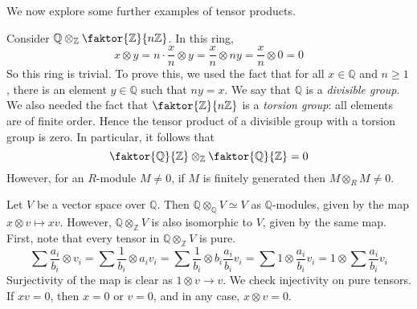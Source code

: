 We now explore some further examples of tensor products.
\begin{example}
    Consider \( \mathbb Q \otimes_{\mathbb Z} \faktor{\mathbb Z}{n\mathbb Z} \).
    In this ring,
    \[ x \otimes y = n \cdot \frac{x}{n} \otimes y = \frac{x}{n} \otimes ny = \frac{x}{n} \otimes 0 = 0 \]
    So this ring is trivial.
    To prove this, we used the fact that for all \( x \in \mathbb Q \) and \( n \geq 1 \), there is an element \( y \in \mathbb Q \) such that \( ny = x \).
    We say that \( \mathbb Q \) is a \emph{divisible group}.
    We also needed the fact that \( \faktor{\mathbb Z}{n\mathbb Z} \) is a \emph{torsion group}: all elements are of finite order.
    Hence the tensor product of a divisible group with a torsion group is zero.
    In particular, it follows that
    \[ \faktor{\mathbb Q}{\mathbb Z} \otimes_{\mathbb Z} \faktor{\mathbb Q}{\mathbb Z} = 0 \]
    However, for an \( R \)-module \( M \neq 0 \), if \( M \) is finitely generated then \( M \otimes_R M \neq 0 \).
\end{example}
\begin{example}
    Let \( V \) be a vector space over \( \mathbb Q \).
    Then \( \mathbb Q \otimes_{\mathbb Q} V \simeq V \) as \( \mathbb Q \)-modules, given by the map \( x \otimes v \mapsto xv \).
    However, \( \mathbb Q \otimes_{\mathbb Z} V \) is also isomorphic to \( V \), given by the same map.
    First, note that every tensor in \( \mathbb Q \otimes_{\mathbb Z} V \) is pure.
    \[ \sum \frac{a_i}{b_i} \otimes v_i = \sum \frac{1}{b_i} \otimes a_i v_i = \sum \frac{1}{b_i} \otimes b_i \frac{a_i}{b_i} v_i = \sum 1 \otimes \frac{a_i}{b_i} v_i = 1 \otimes \sum \frac{a_i}{b_i} v_i \]
    Surjectivity of the map is clear as \( 1 \otimes v \to v \).
    We check injectivity on pure tensors.
    If \( xv = 0 \), then \( x = 0 \) or \( v = 0 \), and in any case, \( x \otimes v = 0 \).
\end{example}
